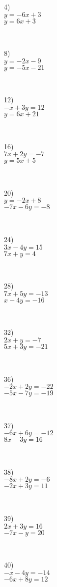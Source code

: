 \begin{multicols}{4}
  4)\\ 
  $y = - 6 x + 3$\\
	$y = 6 x + 3$\par
  ~\par
  8)\\ 
  $y = - 2 x - 9$\\
	$y = - 5 x - 21$\par
  ~\par
  12)\\ 
  $- x + 3 y = 12$\\
  $y = 6 x + 21$\par
  ~\par
  16)\\ 
  $7 x + 2 y = - 7$\\
  $y = 5 x + 5$\par
  ~\par
  20)\\ 
  $y = - 2 x + 8$\\
  $- 7 x - 6 y = - 8$\par
  ~\par
  24)\\ 
  $3 x - 4 y = 15$\\
  $7 x + y = 4$\par
  ~\par
  28)\\ 
  $7 x + 5 y = - 13$\\
  $x - 4 y = - 16$\par
  ~\par
  32)\\ 
  $2 x + y = - 7$\\
  $5 x + 3 y = - 21$\par
  ~\par
  36)\\ 
  $- 2 x + 2 y = - 22$\\
  $- 5 x - 7 y = - 19$\par
  ~\par
  
\end{multicols}

\begin{multicols}{4}
  37)\\ 
  $- 6 x + 6 y = - 12$\\
  $8 x - 3 y = 16$\par
  ~\par
  
  38)\\ 
  $- 8 x + 2 y = - 6$\\
  $- 2 x + 3 y = 11$\par
  ~\par

  39)\\ 
  $2 x + 3 y = 16$\\
  $- 7 x - y = 20$\par
  ~\par

  40)\\ 
  $- x - 4 y = - 14$\\
  $- 6 x + 8 y = 12$\par
  ~\par	
\end{multicols}


